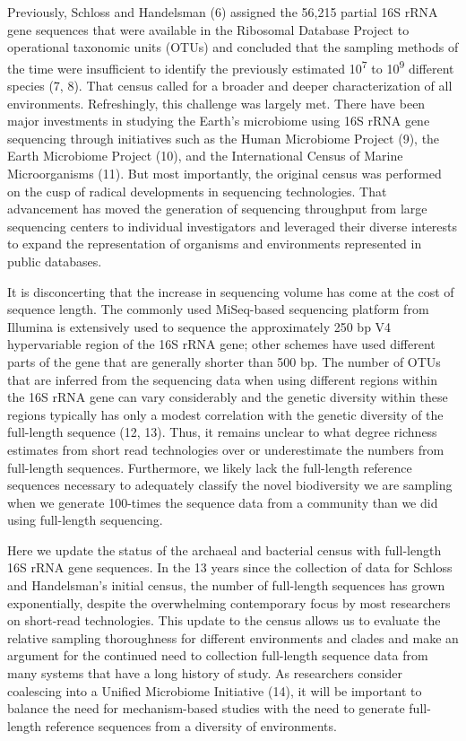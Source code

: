 \documentclass[11pt,]{article}
\begin{document}
Previously, Schloss and Handelsman (6) assigned the 56,215 partial 16S
rRNA gene sequences that were available in the Ribosomal Database
Project to operational taxonomic units (OTUs) and concluded that the
sampling methods of the time were insufficient to identify the
previously estimated 10\textsuperscript{7} to 10\textsuperscript{9}
different species (7, 8). That census called for a broader and deeper
characterization of all environments. Refreshingly, this challenge was
largely met. There have been major investments in studying the Earth's
microbiome using 16S rRNA gene sequencing through initiatives such as
the Human Microbiome Project (9), the Earth Microbiome Project (10), and
the International Census of Marine Microorganisms (11). But most
importantly, the original census was performed on the cusp of radical
developments in sequencing technologies. That advancement has moved the
generation of sequencing throughput from large sequencing centers to
individual investigators and leveraged their diverse interests to expand
the representation of organisms and environments represented in public
databases.

It is disconcerting that the increase in sequencing volume has come at
the cost of sequence length. The commonly used MiSeq-based sequencing
platform from Illumina is extensively used to sequence the approximately
250 bp V4 hypervariable region of the 16S rRNA gene; other schemes have
used different parts of the gene that are generally shorter than 500 bp.
The number of OTUs that are inferred from the sequencing data when using
different regions within the 16S rRNA gene can vary considerably and the
genetic diversity within these regions typically has only a modest
correlation with the genetic diversity of the full-length sequence (12,
13). Thus, it remains unclear to what degree richness estimates from
short read technologies over or underestimate the numbers from
full-length sequences. Furthermore, we likely lack the full-length
reference sequences necessary to adequately classify the novel
biodiversity we are sampling when we generate 100-times the sequence
data from a community than we did using full-length sequencing.

Here we update the status of the archaeal and bacterial census with
full-length 16S rRNA gene sequences. In the 13 years since the
collection of data for Schloss and Handelsman's initial census, the
number of full-length sequences has grown exponentially, despite the
overwhelming contemporary focus by most researchers on short-read
technologies. This update to the census allows us to evaluate the
relative sampling thoroughness for different environments and clades and
make an argument for the continued need to collection full-length
sequence data from many systems that have a long history of study. As
researchers consider coalescing into a Unified Microbiome Initiative
(14), it will be important to balance the need for mechanism-based
studies with the need to generate full-length reference sequences from a
diversity of environments.
\end{document}
